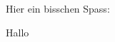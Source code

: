 \documentclass{book}
\begin{document}
Hier ein bisschen Spass:
\begin{definition}[wau]
Hallo
\end{definition}
\end{document}
